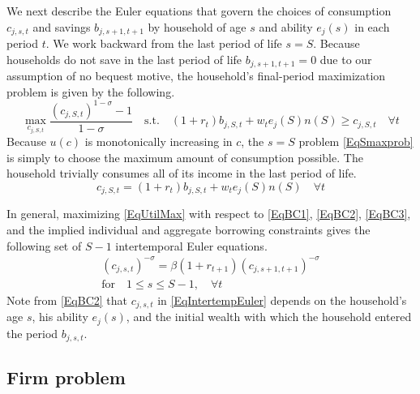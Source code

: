 \documentclass[letterpaper,12pt]{article}
\theoremstyle{definition}
\begin{document}
\begin{spacing}{1.5}
    We next describe the Euler equations that govern the choices of consumption $c_{j,s,t}$ and savings $b_{j,s+1,t+1}$ by household of age $s$ and ability $e_j(s)$ in each period $t$. We work backward from the last period of life $s = S$. Because households do not save in the last period of life $b_{j,s+1,t+1}=0$ due to our assumption of no bequest motive, the household's final-period maximization problem is given by the following.
    \begin{equation}\label{EqSmaxprob}
      \max_{c_{j,S,t}} \frac{\left(c_{j,S,t}\right)^{1-\sigma} - 1}{1 - \sigma} \quad \text{s.t.} \quad \left(1+r_t\right)b_{j,S,t} + w_t e_j(S)n(S) \geq c_{j,S,t} \quad \forall t
    \end{equation}
    Because $u(c)$ is monotonically increasing in $c$, the $s=S$ problem \eqref{EqSmaxprob} is simply to choose the maximum amount of consumption possible. The household trivially consumes all of its income in the last period of life.
    \begin{equation}\label{EqScons}
      c_{j,S,t} = \left(1+r_t\right)b_{j,S,t} + w_t e_j(S)n(S) \quad \forall t
    \end{equation}

    In general, maximizing \eqref{EqUtilMax} with respect to \eqref{EqBC1}, \eqref{EqBC2}, \eqref{EqBC3}, and the implied individual and aggregate borrowing constraints gives the following set of $S-1$ intertemporal Euler equations.
    \begin{equation}\label{EqIntertempEuler}
      \begin{split}
        \left(c_{j,s,t}\right)^{-\sigma} = \beta \left(1+r_{t+1}\right)\left(c_{j,s+1,t+1}\right)^{-\sigma} \\
        \text{for} \quad 1\leq s\leq S-1, \quad \forall t
      \end{split}
    \end{equation}
    Note from \eqref{EqBC2} that $c_{j,s,t}$ in \eqref{EqIntertempEuler} depends on the household's age $s$, his ability $e_j(s)$, and the initial wealth with which the household entered the period $b_{j,s,t}$.


  \subsection{Firm problem}\label{SecModelGenFirm}


\end{spacing}
\end{document}
